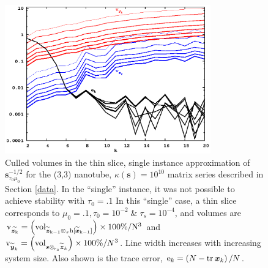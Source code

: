 \documentclass[letterpaper,twocolumn,amsmath,amsfont,amssymb,english,aps,jcp,preprintnumbers,groupaddress,nofootinbib,tightenlines,floatfix]{revtex4}
\newcommand{\mat}[1]{\boldsymbol{#1}}
\newcommand{\ot}{  {\scriptstyle \otimes}_{ \tau } }
\newcommand{\ots}{ {\scriptstyle \otimes}_{ \! \tau_s } }
\theoremstyle{plain}
\theoremstyle{remark}
\theoremstyle{plain}
\begin{document}
\begin{figure}[h]
 \includegraphics[width=3.5in]{fig_33_tube_cond_10_regularized_33_tube_k10_regularized_stab.eps}
\caption{
Culled volumes in the thin slice, single instance approximation of $\mat{s}^{-1/2}_{\tau_0 \mu_0}$
for the (3,3) nanotube, $\kappa(\mat{s})=10^{10}$ matrix series 
described in Section \ref{data}.  In the ``single'' instance, it was not possible to achieve stability with $\tau_0=.1$
In this ``single'' case, a thin slice corresponds to $\mu_0=.1, \tau_0=10^{-2} \;  \&  \; \tau_s=10^{-4}$, and volumes are
$\rm v_{\widetilde{\mat{z}_k}} = \left( {\rm vol}_{ \widetilde{\mat{z}}_{k-1}\ot h[\widetilde{\mat{x}}_{k-1}] } \right) \times 100\% /N^3$ and
${\rm v}_{\widetilde{\mat{y}}_k} = \left( {\rm vol}_{\mat{s}  \ots  \widetilde{\mat{z}}_{k}} \right) \times 100\% /N^3$.    
Line width increases with increasing system size. 
Also shown is the trace error, ${\rm e}_{k} = \left( N-{\rm tr}\,\mat{x}_k \right)/N$.}\label{regularized_stab}
\end{figure} 
\end{document}

